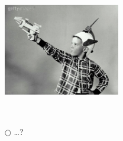 \NEWSEC

\subsection{\ssVerRadiation}

\begin{frame}[fragile,label=ss-ver-radiation] 
\secframetitle{\ssVerRadiation}
\begin{center}
\begin{minipage}{3.6in}
\begin{enumerate}
\item[\redcirc] \highpriority\ 
\item[\redcirc] \highpriority\  \ \\
\centerline{\includegraphics[width=2.0in]{Images/remco_gun_boy2.jpg}}
\item[\redcirc] \highpriority\ 
\pause
\item[$\bigcirc$] \ldots ?
\end{enumerate}
\end{minipage}
\end{center}
\end{frame}

